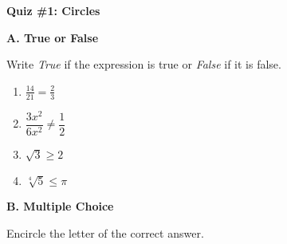 \documentclass[12pt, letterpaper]{article}
\begin{document}
	\begin{center}
		\textbf{\large Quiz \#1: Circles}
	\end{center}
	
	\vspace*{5mm}
	
	\noindent \textbf{A. True or False} 
	
	Write \textit{True} if the expression is true or \textit{False} if it is false. 
	
	\begin{multicols}{2}
	\begin{enumerate}
		
			\item $ \frac{14}{21} = \frac{2}{3} $
			\item $ \dfrac{3x^2}{6x^2} \neq \dfrac{1}{2} $
			\item $ \sqrt{3} \geq 2 $
			\item $ \sqrt[4]{5} \leq \pi $
		
	\end{enumerate}
\end{multicols}
	
	\vspace*{4mm}
	
	\noindent \textbf{B. Multiple Choice} 
	
	Encircle the letter of the correct answer.
	
\end{document}
